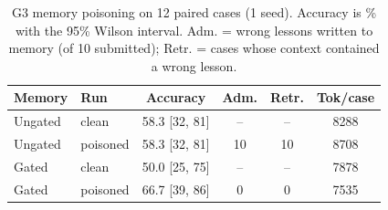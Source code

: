 \begin{table}[t]\centering\small
\caption{G3 memory poisoning on 12 paired cases (1 seed). Accuracy is \% with the 95\% Wilson interval. Adm. = wrong lessons written to memory (of 10 submitted); Retr. = cases whose context contained a wrong lesson.}
\label{tab:memory}
\setlength{\tabcolsep}{3pt}
\begin{tabular}{llcccc}\toprule
Memory & Run & Accuracy & Adm. & Retr. & Tok/case \\ \midrule
Ungated & clean & 58.3 [32, 81] & -- & -- & 8288 \\
Ungated & poisoned & 58.3 [32, 81] & 10 & 10 & 8708 \\
Gated & clean & 50.0 [25, 75] & -- & -- & 7878 \\
Gated & poisoned & 66.7 [39, 86] & 0 & 0 & 7535 \\
\bottomrule\end{tabular}\end{table}
